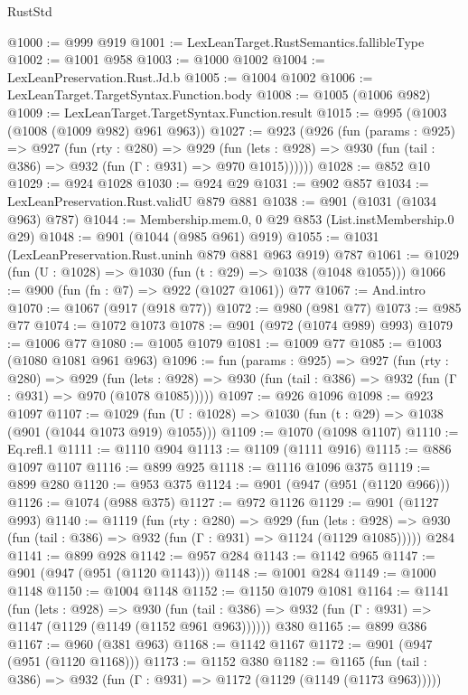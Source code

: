 \begin{lexlean}{RustStd}
\begin{coremodule}
@1000 := @999 @919
@1001 := LexLeanTarget.RustSemantics.fallibleType
@1002 := @1001 @958
@1003 := @1000 @1002
@1004 := LexLeanPreservation.Rust.Jd.b
@1005 := @1004 @1002
@1006 := LexLeanTarget.TargetSyntax.Function.body
@1008 := @1005 (@1006 @982)
@1009 := LexLeanTarget.TargetSyntax.Function.result
@1015 := @995 (@1003 (@1008 (@1009 @982) @961 @963))
@1027 := @923
    (@926
      (fun (params : @925) =>
      @927
        (fun (rty : @280) =>
        @929
          (fun (lets : @928) => @930 (fun (tail : @386) => @932 (fun (Γ : @931) => @970 @1015))))))
@1028 := @852 @10
@1029 := @924 @1028
@1030 := @924 @29
@1031 := @902 @857
@1034 := LexLeanPreservation.Rust.validU @879 @881
@1038 := @901 (@1031 (@1034 @963) @787)
@1044 := Membership.mem.{0, 0} @29 @853 (List.instMembership.{0} @29)
@1048 := @901 (@1044 (@985 @961) @919)
@1055 := @1031 (LexLeanPreservation.Rust.uninh @879 @881 @963 @919) @787
@1061 := @1029 (fun (U : @1028) => @1030 (fun (t : @29) => @1038 (@1048 @1055)))
@1066 := @900 (fun (fn : @7) => @922 (@1027 @1061)) @77
@1067 := And.intro
@1070 := @1067 (@917 (@918 @77))
@1072 := @980 (@981 @77)
@1073 := @985 @77
@1074 := @1072 @1073
@1078 := @901 (@972 (@1074 @989) @993)
@1079 := @1006 @77
@1080 := @1005 @1079
@1081 := @1009 @77
@1085 := @1003 (@1080 @1081 @961 @963)
@1096 := fun (params : @925) =>
  @927
    (fun (rty : @280) =>
    @929
      (fun (lets : @928) =>
      @930 (fun (tail : @386) => @932 (fun (Γ : @931) => @970 (@1078 @1085)))))
@1097 := @926 @1096
@1098 := @923 @1097
@1107 := @1029 (fun (U : @1028) => @1030 (fun (t : @29) => @1038 (@901 (@1044 @1073 @919) @1055)))
@1109 := @1070 (@1098 @1107)
@1110 := Eq.refl.{1}
@1111 := @1110 @904
@1113 := @1109 (@1111 @916)
@1115 := @886 @1097 @1107
@1116 := @899 @925
@1118 := @1116 @1096 @375
@1119 := @899 @280
@1120 := @953 @375
@1124 := @901 (@947 (@951 (@1120 @966)))
@1126 := @1074 (@988 @375)
@1127 := @972 @1126
@1129 := @901 (@1127 @993)
@1140 := @1119
    (fun (rty : @280) =>
    @929
      (fun (lets : @928) =>
      @930 (fun (tail : @386) => @932 (fun (Γ : @931) => @1124 (@1129 @1085)))))
    @284
@1141 := @899 @928
@1142 := @957 @284
@1143 := @1142 @965
@1147 := @901 (@947 (@951 (@1120 @1143)))
@1148 := @1001 @284
@1149 := @1000 @1148
@1150 := @1004 @1148
@1152 := @1150 @1079 @1081
@1164 := @1141
    (fun (lets : @928) =>
    @930 (fun (tail : @386) => @932 (fun (Γ : @931) => @1147 (@1129 (@1149 (@1152 @961 @963))))))
    @380
@1165 := @899 @386
@1167 := @960 (@381 @963)
@1168 := @1142 @1167
@1172 := @901 (@947 (@951 (@1120 @1168)))
@1173 := @1152 @380
@1182 := @1165
    (fun (tail : @386) => @932 (fun (Γ : @931) => @1172 (@1129 (@1149 (@1173 @963)))))

\end{coremodule}
\end{lexlean}
